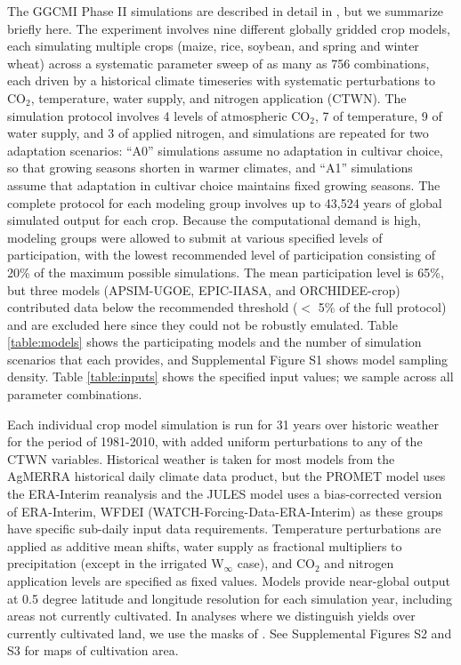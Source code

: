 \documentclass[gmd, manuscript]{copernicus} %
\begin{document}
The GGCMI Phase II simulations are described in detail in \citet{Franke2019a}, but we summarize briefly here. 
The experiment involves nine different globally gridded crop models, each simulating multiple crops (maize, rice, soybean, and spring and winter wheat) across a systematic parameter sweep of as many as 756 combinations, each driven by a historical climate timeseries with systematic perturbations to CO$_2$, temperature, water supply, and nitrogen application (CTWN). The simulation protocol involves 4 levels of atmospheric CO$_2$, 7 of temperature, 9 of water supply, and 3 of applied nitrogen, and simulations are repeated for two adaptation scenarios: ``A0'' simulations assume no adaptation in cultivar choice, so that growing seasons shorten in warmer climates, and ``A1'' simulations assume that adaptation in cultivar choice maintains fixed growing seasons.
The complete protocol for each modeling group involves up to 43,524 years of global simulated output for each crop. 
Because the computational demand is high, modeling groups were allowed to submit at various specified levels of participation, with the lowest recommended level of participation consisting of 20\% of the maximum possible simulations. The mean participation level is 65\%, but  
three models (APSIM-UGOE, EPIC-IIASA, and ORCHIDEE-crop) contributed data %
below the recommended threshold ($<$ 5\% of the full protocol) and are excluded here since they could not be robustly emulated. 
Table \ref{table:models} shows the participating models and the number of simulation scenarios that each provides, and Supplemental Figure S1 shows model sampling density. Table \ref{table:inputs} shows the specified input values; we sample across all parameter combinations. 

Each individual crop model simulation is run for 31 years over historic weather for the period of 1981-2010, with added uniform perturbations to any of the CTWN variables.
Historical weather is taken for most models from the AgMERRA \citep{Ruane2015} historical daily climate data product, but the PROMET model uses the ERA-Interim reanalysis \citep{dee2011era} and the JULES model uses a bias-corrected version of ERA-Interim, WFDEI (WATCH-Forcing-Data-ERA-Interim) \citep{weedon2014wfdei} as these groups have specific sub-daily input data requirements. 
Temperature perturbations are applied as additive mean shifts, water supply as fractional multipliers to precipitation (except in the irrigated W$_{\infty}$ case), and CO$_2$ and nitrogen application levels are specified as fixed values. 
Models provide near-global output at 0.5 degree latitude and longitude resolution for each simulation year, including areas not currently cultivated. 
In analyses where we distinguish yields over currently cultivated land, we use the masks of \citet{Portmann2010}. 
See Supplemental Figures S2 and S3 for maps of cultivation area.
\end{document}
